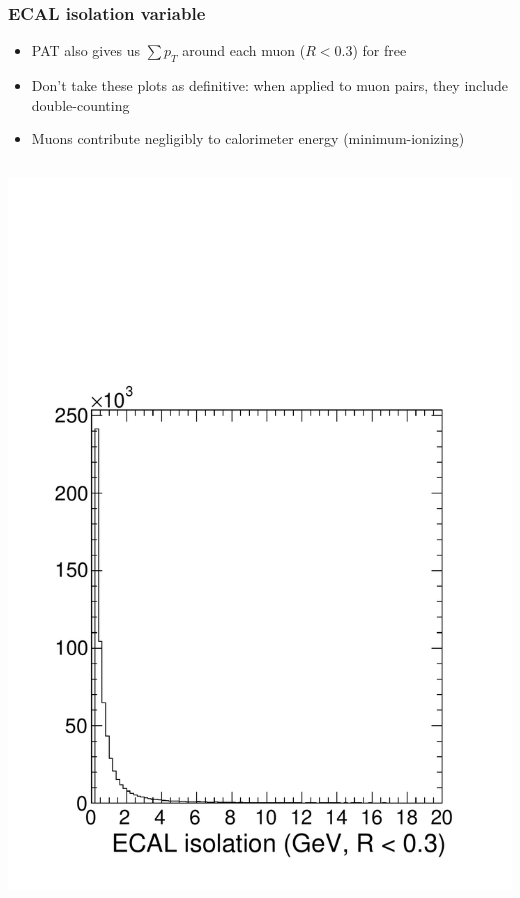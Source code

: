 \documentclass[compress]{beamer}
\begin{document}
\begin{frame}
\frametitle{ECAL isolation variable}

\begin{itemize}
\item PAT also gives us $\sum p_T$ around each muon ($R < 0.3$) for free
\item Don't take these plots as definitive: when applied to muon pairs, they include double-counting
\item Muons contribute negligibly to calorimeter energy (minimum-ionizing)
\end{itemize}

\begin{columns}
\includegraphics[width=\linewidth]{ecaliso.pdf}

\end{columns}
\end{frame}
\end{document}

